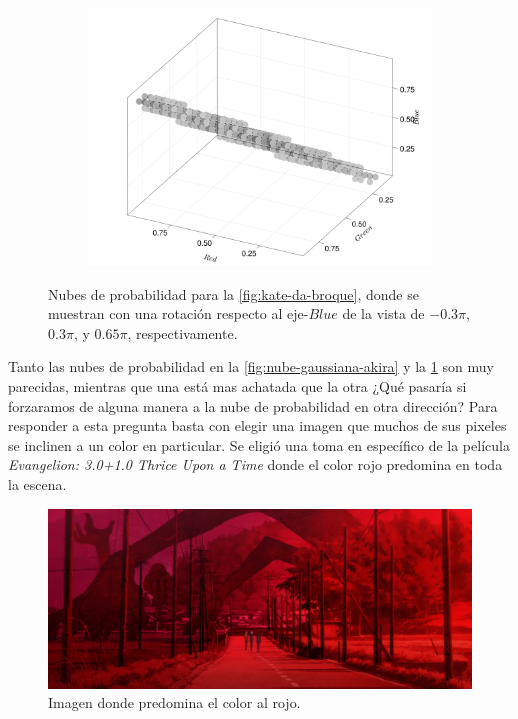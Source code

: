 \begin{figure}[ht!]
\begin{subfigure}[c]{0.3\textwidth}
    \end{subfigure}
    \begin{subfigure}[c]{0.3\textwidth}
        \centering
        \includegraphics[scale=0.09]{../figures/gaussian_cloud_kate_3}
    \end{subfigure}
    \caption{Nubes de probabilidad para la \cref{fig:kate-da-broque}, donde se muestran con una rotación respecto al eje-$Blue$ de la vista de $-0.3\pi$, $0.3\pi$, y $0.65\pi$, respectivamente.}
    \label{fig:nube-gaussiana-kate}
\end{figure}

Tanto las nubes de probabilidad en la \cref{fig:nube-gaussiana-akira} y la \cref{fig:nube-gaussiana-kate} son muy parecidas, mientras que una está mas achatada que la otra ¿Qué pasaría si forzaramos de alguna manera a la nube de probabilidad en otra dirección? Para responder a esta pregunta basta con elegir una imagen que muchos de sus pixeles se inclinen a un color en particular. Se eligió una toma en específico de la película \textit{Evangelion: 3.0+1.0 Thrice Upon a Time} \cite{hideaki2022eva} donde el color rojo predomina en toda la escena.
\begin{figure}[ht!]
    \centering
    \includegraphics[scale=0.2]{../figures/evangelion}
    \caption{Imagen donde predomina el color al rojo.}
    \label{fig:evangelion}
\end{figure}

